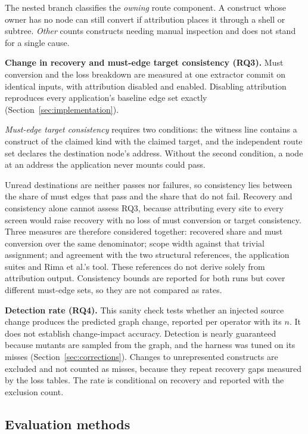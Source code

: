 The nested branch classifies the \emph{owning} route component. A construct whose owner has no node can still
convert if attribution places it through a shell or subtree.
\emph{Other} counts constructs needing manual inspection and does not stand for a single cause.

\textbf{Change in recovery and must-edge target consistency (RQ3).} Must conversion and the loss breakdown are
measured at one extractor commit on identical inputs, with attribution disabled and enabled.
Disabling attribution reproduces every application's baseline edge set exactly
(Section~\ref{sec:implementation}).

\emph{Must-edge target consistency} requires two conditions: the witness line contains a construct
of the claimed kind with the claimed target, and the independent route set declares the destination
node's address. Without the second condition, a node at an address the application never mounts could pass.

Unread destinations are neither passes nor failures, so consistency lies between the share of must
edges that pass and the share that do not fail. Recovery and consistency alone cannot assess RQ3,
because attributing every site to every screen would raise recovery with no loss of must
conversion or target consistency. Three measures are therefore considered together: recovered share
and must conversion over the same denominator; scope width against that trivial assignment; and agreement with the two structural references, the application
suites and Rima et al.'s tool. These references do not derive solely
from attribution output. Consistency bounds are reported for both runs but cover different must-edge
sets, so they are not compared as rates.

\textbf{Detection rate (RQ4).} This sanity check tests whether an injected source change produces
the predicted graph change, reported per operator with its $n$. It does not establish change-impact
accuracy. Detection is nearly guaranteed because mutants are sampled from the graph, and the
harness was tuned on its misses (Section~\ref{sec:corrections}). Changes to unrepresented constructs
are excluded and not counted as misses, because they repeat recovery gaps measured by the loss
tables. The rate is conditional on recovery and reported with the exclusion count.

\subsection{Evaluation methods}
\label{sec:protocol}

